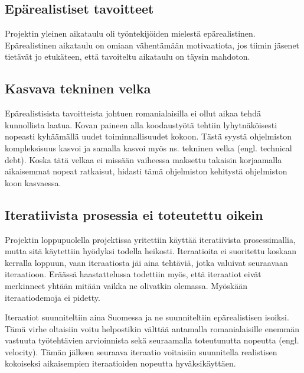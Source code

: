 \documentclass[a4paper]{article}
\begin{document}
\subsection{Epärealistiset tavoitteet}

Projektin yleinen aikataulu oli työntekijöiden mielestä epärealistinen. Epärealistinen aikataulu on omiaan vähentämään motivaatiota, jos tiimin jäsenet tietävät jo etukäteen, että tavoiteltu aikataulu on täysin mahdoton.

\subsection{Kasvava tekninen velka}

Epärealistisista tavoitteista johtuen romanialaisilla ei ollut aikaa tehdä kunnollista laatua. Kovan paineen alla koodaustyötä tehtiin lyhytnäköisesti nopeasti kyhäämällä uudet toiminnallisuudet kokoon. Tästä syystä ohjelmiston kompleksisuus kasvoi ja samalla kasvoi myös ns. tekninen velka (engl. technical debt). Koska tätä velkaa ei missään vaiheessa maksettu takaisin korjaamalla aikaisemmat nopeat ratkaisut, hidasti tämä ohjelmiston kehitystä ohjelmiston koon kasvaessa.

\subsection{Iteratiivista prosessia ei toteutettu oikein}

Projektin loppupuolella projektissa yritettiin käyttää iteratiivista prosessimallia, mutta sitä käytettiin hyödyksi todella heikosti. Iteraatioita ei suoritettu koskaan kerralla loppuun, vaan iteraatiosta jäi aina tehtäviä, jotka valuivat seuraavaan iteraatioon. Eräässä haastattelussa todettiin myös, että iteraatiot eivät merkinneet yhtään mitään vaikka ne olivatkin olemassa. Myöskään iteraatiodemoja ei pidetty.

Iteraatiot suunniteltiin aina Suomessa ja ne suunniteltiin epärealistisen isoiksi. Tämä virhe oltaisiin voitu helpostikin välttää antamalla romanialaisille enemmän vastuuta työtehtävien arvioinnista sekä seuraamalla toteutunutta nopeutta (engl. velocity). Tämän jälkeen seuraava iteraatio voitaisiin suunnitella realistisen kokoiseksi aikaisempien iteraatioiden nopeutta hyväksikäyttäen.
\end{document}
